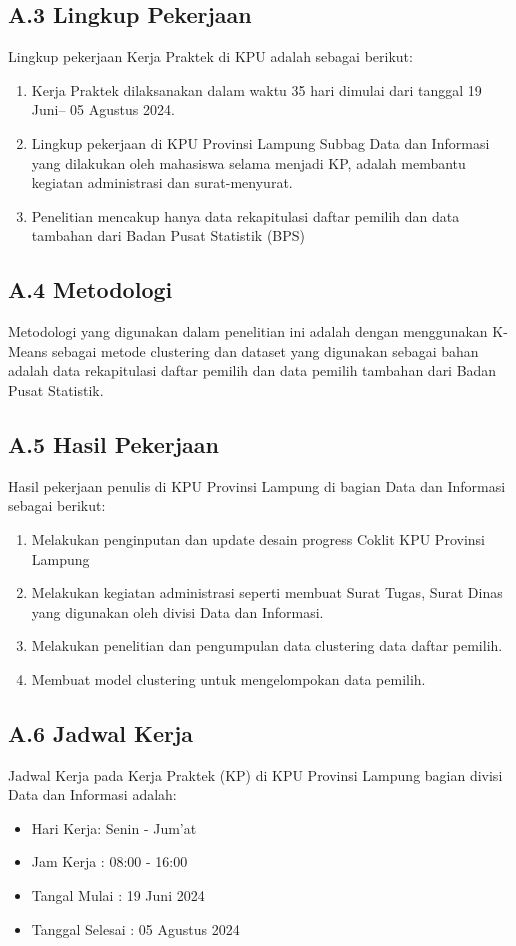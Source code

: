 \subsection*{A.3 Lingkup Pekerjaan}
Lingkup pekerjaan Kerja Praktek di KPU adalah sebagai berikut:
\begin{enumerate}
    \item Kerja Praktek dilaksanakan dalam waktu 35 hari dimulai dari tanggal 19 Juni– 05 Agustus 2024.
    \item Lingkup pekerjaan di KPU Provinsi Lampung Subbag Data dan Informasi yang dilakukan oleh mahasiswa selama menjadi KP, adalah membantu kegiatan administrasi dan surat-menyurat.
    \item Penelitian mencakup hanya data rekapitulasi daftar pemilih dan data tambahan dari Badan Pusat Statistik (BPS)
\end{enumerate}

\subsection*{A.4 Metodologi}
Metodologi yang digunakan dalam penelitian ini adalah dengan menggunakan K-Means sebagai metode clustering dan dataset yang digunakan sebagai bahan adalah data rekapitulasi daftar pemilih dan data pemilih tambahan dari Badan Pusat Statistik.


\subsection*{A.5 Hasil Pekerjaan}
Hasil pekerjaan penulis di KPU Provinsi Lampung di bagian Data dan Informasi sebagai berikut:
\begin{enumerate}
    \item Melakukan penginputan dan update desain progress Coklit KPU Provinsi Lampung
    \item Melakukan kegiatan administrasi seperti membuat Surat Tugas, Surat Dinas yang digunakan oleh divisi Data dan Informasi.
    \item Melakukan penelitian dan pengumpulan data clustering data daftar pemilih.
    \item Membuat model clustering untuk mengelompokan data pemilih.
\end{enumerate}

\subsection*{A.6 Jadwal Kerja}
Jadwal Kerja pada Kerja Praktek (KP) di KPU Provinsi Lampung bagian divisi Data dan Informasi adalah:
\begin{itemize}
    \item Hari Kerja: Senin - Jum'at
    \item Jam Kerja : 08:00 - 16:00
    \item Tangal Mulai :  19 Juni 2024
    \item Tanggal Selesai : 05 Agustus 2024
\end{itemize}

